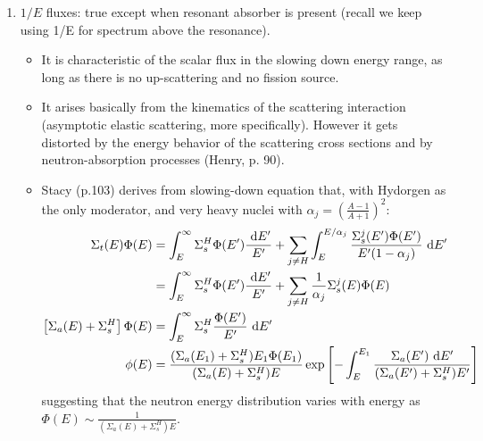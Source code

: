 \documentclass{school-22.211-notes}
\begin{document}
\begin{enumerate}
\item $1/E$ fluxes: true except when resonant absorber is present (recall we keep using 1/E for spectrum above the resonance). 
  \begin{itemize}
  \item It is characteristic of the scalar flux in the slowing down energy range, as long as there is no up-scattering and no fission source. 
  \item It arises basically from the kinematics of the scattering interaction (asymptotic elastic scattering, more specifically). However it gets distorted by the energy behavior of the scattering cross sections and by neutron-absorption processes (Henry, p. 90). 
  \item Stacy (p.103) derives from slowing-down equation that, with Hydorgen as the only moderator, and very heavy nuclei with $\alpha_j = \left(\frac{A-1}{A+1} \right)^2$:
    \begin{align}
      \Sigma_t(E) \Phi(E) &= \int_E^{\infty} \Sigma_s^H \Phi(E')\frac{\mbox{ }\mathrm{d} E'}{E'} + \displaystyle\sum_{j\neq H} \int_E^{E/\alpha_j} \frac{\Sigma_s^j (E') \Phi(E')}{E'(1-\alpha_j)} \mbox{ }\mathrm{d} E' \\
      &=  \int_E^{\infty} \Sigma_s^H \Phi(E')\frac{\mbox{ }\mathrm{d} E'}{E'} + \displaystyle\sum_{j\neq H} \frac{1}{\alpha_j} \Sigma_s^j (E) \Phi(E) \\
      \left[ \Sigma_a (E) + \Sigma_s^H \right] \Phi(E) &= \int_E^{\infty} \Sigma_s^H \frac{\Phi(E')}{E'} \mbox{ }\mathrm{d} E' \\
      \phi(E) &= \frac{(\Sigma_a (E_1) + \Sigma_s^H) E_1 \Phi (E_1) }{(\Sigma_a(E) + \Sigma_s^H) E} \exp \left[ - \int_E^{E_1} \frac{\Sigma_a (E') \mbox{ }\mathrm{d} E'}{(\Sigma_a(E') + \Sigma_s^H) E'} \right]
    \end{align} 
    suggesting that the neutron energy distribution varies with energy as $\Phi(E) \sim \frac{1}{(\Sigma_a(E) + \Sigma_s^H) E}$. 
  \end{itemize}




\end{enumerate}
\end{document}
